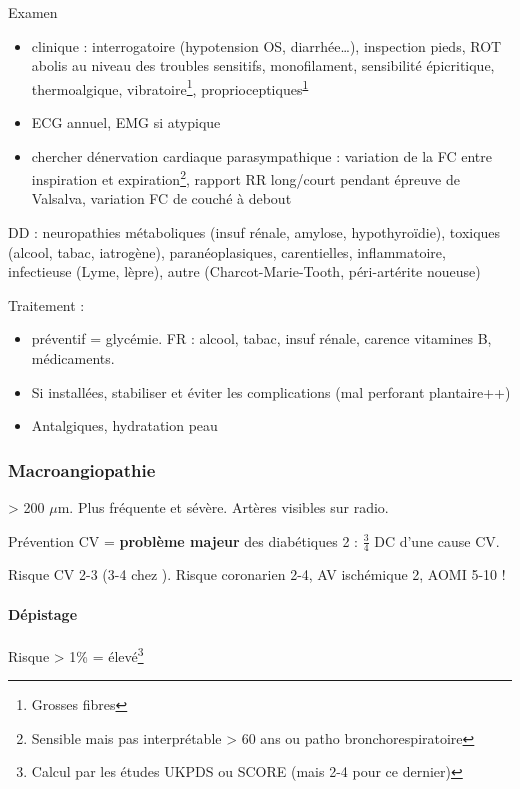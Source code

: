 \documentclass[11pt]{article}
\begin{document}
Examen 
\begin{itemize}
\item clinique : interrogatoire (hypotension OS, diarrhée\ldots{}), inspection pieds, ROT abolis au niveau des troubles sensitifs, monofilament, sensibilité épicritique, thermoalgique, vibratoire\footnote{Grosses fibres\label{org1c4c389}}, proprioceptiques\textsuperscript{\ref{org1c4c389}}
\item ECG annuel, EMG si atypique
\item chercher dénervation cardiaque parasympathique : variation de la FC entre
inspiration et expiration\footnote{Sensible mais pas interprétable > 60 ans ou patho bronchorespiratoire}, rapport RR long/court pendant épreuve de
Valsalva, variation FC de couché à debout
\end{itemize}

DD : neuropathies métaboliques (insuf rénale, amylose, hypothyroïdie), toxiques
(alcool, tabac, iatrogène), paranéoplasiques, carentielles, inflammatoire,
infectieuse (Lyme, lèpre), autre (Charcot-Marie-Tooth, péri-artérite noueuse)

Traitement : 
\begin{itemize}
\item préventif = glycémie. FR : alcool, tabac, insuf rénale, carence
vitamines B, médicaments.
\item Si installées, stabiliser et éviter les complications
(mal perforant plantaire++)
\item Antalgiques, hydratation peau
\end{itemize}

\subsubsection{Macroangiopathie}
\label{sec:orgb8ee0a1}
\diameter > 200 \(\mu\)m. Plus fréquente et sévère. Artères visibles sur radio.

Prévention CV = \textbf{problème majeur} des diabétiques 2 : \(\frac{3}{4}\) DC d'une cause
CV. 

Risque CV \texttimes{}2-3 (\texttimes{}3-4 chez \female). Risque coronarien \texttimes{}2-4, AV ischémique
\texttimes{}2, AOMI \texttimes{}5-10 !

\paragraph{Dépistage}
\label{sec:org81459bb}
Risque > 1\% = élevé\footnote{Calcul par les études UKPDS ou SCORE (mais \texttimes{}2-4 pour ce dernier)}
\end{document}
